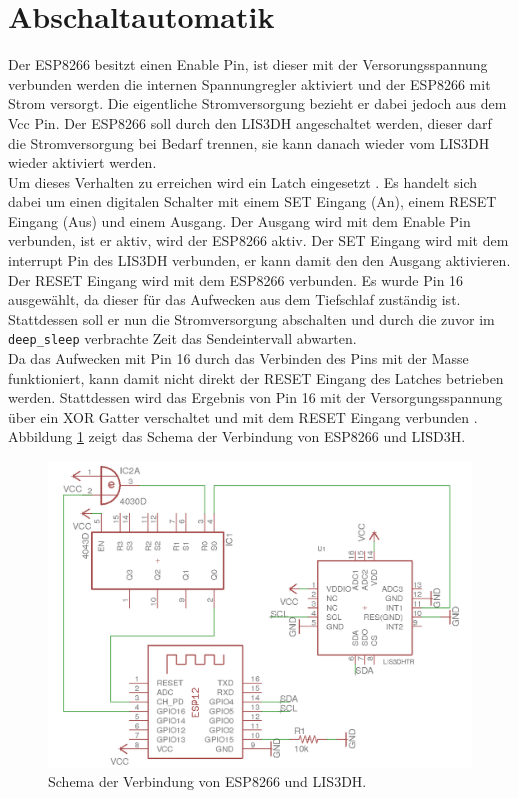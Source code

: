 \section{Abschaltautomatik}
\label{ch:Beschleunigungssensor:sec:Abschaltautomatik}
Der ESP8266 besitzt einen Enable Pin, ist dieser mit der Versorungsspannung verbunden werden die internen Spannungregler aktiviert und der ESP8266 mit Strom versorgt.
Die eigentliche Stromversorgung bezieht er dabei jedoch aus dem Vcc Pin.
Der ESP8266 soll durch den LIS3DH angeschaltet werden, dieser darf die Stromversorgung bei Bedarf trennen, sie kann danach wieder vom LIS3DH wieder aktiviert werden. \\
Um dieses Verhalten zu erreichen wird ein Latch eingesetzt \cite{texas2003latch}.
Es handelt sich dabei um einen digitalen Schalter mit einem SET Eingang (An), einem RESET Eingang (Aus) und einem Ausgang.
Der Ausgang wird mit dem Enable Pin verbunden, ist er aktiv, wird der ESP8266 aktiv.
Der SET Eingang wird mit dem interrupt Pin des LIS3DH verbunden, er kann damit den den Ausgang aktivieren.
Der RESET Eingang wird mit dem ESP8266 verbunden. 
Es wurde Pin 16 ausgewählt, da dieser für das Aufwecken aus dem Tiefschlaf zuständig ist. 
Stattdessen soll er nun die Stromversorgung abschalten und durch die zuvor im \texttt{deep\_sleep} verbrachte Zeit das Sendeintervall abwarten.\\
Da das Aufwecken mit Pin 16 durch das Verbinden des Pins mit der Masse funktioniert, kann damit nicht direkt der RESET Eingang des Latches betrieben werden.
Stattdessen wird das Ergebnis von Pin 16 mit der Versorgungsspannung über ein XOR Gatter verschaltet und mit dem RESET Eingang verbunden \cite{texas2014xor}.
Abbildung \ref{fig:schematics} zeigt das Schema der Verbindung von ESP8266 und LISD3H.

\begin{figure}[h]
  \centering
	\includegraphics[width=\textwidth]{images/schematics.png}
  \caption{Schema der Verbindung von ESP8266 und LIS3DH.}
  \label{fig:schematics}
\end{figure}

